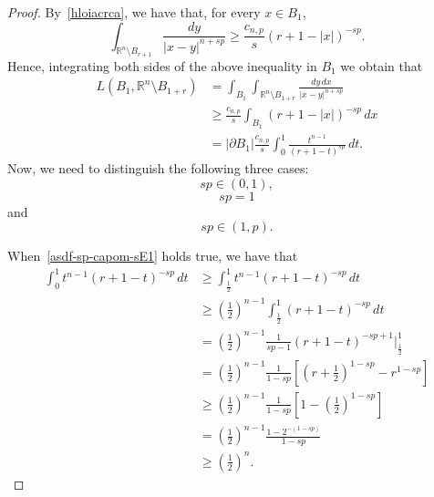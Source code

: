 \documentclass[12pt]{article}
\newcommand{\R}{\mathbb{R}}
\numberwithin{equation}{section}
\renewcommand{\geq}{\geqslant}
\begin{document}
\begin{appendix}
\begin{proof}
By~\eqref{hloiacrca}, we have that, for every $x\in B_1$, 
\begin{equation*}
\int_{\R^n\setminus B_{r+1}}\frac{dy}{\left|x-y\right|^{n+sp}}\geq \frac{c_{n,p}}{s} (r+1-\left|x\right|)^{-sp}. 
\end{equation*}
Hence, integrating both sides of the above inequality in $B_1$ we obtain that 
\begin{equation}\label{fcmlahnftrgflopt55554}
\begin{split}
L(B_1,\R^n\setminus B_{1+r})&=\int_{B_1}\int_{\R^n\setminus B_{1+r}}\frac{dy\,dx}{\left|x-y\right|^{n+sp}}\\
&\geq \frac{c_{n,p}}{s} \int_{B_1} (r+1-\left|x\right|)^{-sp}\,dx\\ 
&=\left|\partial B_1\right|\frac{c_{n,p}}{s}\int_{0}^1\frac{t^{n-1}}{(r+1-t)^{sp}}\,dt.
\end{split}
\end{equation}
Now, we need to distinguish the following three cases:
\begin{equation}\label{asdf-sp-capom-sE1}
sp\in(0,1),\end{equation}
\begin{equation}\label{asdf-sp-capom-sE2}
sp=1\end{equation}
and
\begin{equation}\label{asdf-sp-capom-sE3}sp\in (1,p).
\end{equation}

When~\eqref{asdf-sp-capom-sE1} holds true, we have that 
\begin{equation*}
\begin{split}
\int_{0}^1t^{n-1}(r+1-t)^{-sp}\,dt&\geq \int_{\frac{1}{2}}^1 t^{n-1}(r+1-t)^{-sp}\,dt\\
&\geq \left(\frac{1}{2}\right)^{n-1}\int_{\frac{1}{2}}^1 (r+1-t)^{-sp}\,dt\\
&=\left(\frac{1}{2}\right)^{n-1}\frac{1}{sp-1}(r+1-t)^{-sp+1}\bigg|_{\frac{1}{2}}^1\\
&=\left(\frac{1}{2}\right)^{n-1}\frac{1}{1-sp}\left[\left(r+\frac{1}{2}\right)^{1-sp}-r^{1-sp}\right]\\
&\geq \left(\frac{1}{2}\right)^{n-1}\frac{1}{1-sp}\left[1-\left(\frac{1}{2}\right)^{1-sp}\right]\\
&=\left(\frac{1}{2}\right)^{n-1}\frac{1-2^{-(1-sp)}}{1-sp}\\
&\geq \left(\frac{1}{2}\right)^n. 
\end{split}
\end{equation*}


\end{proof}
\end{appendix}
\end{document}

